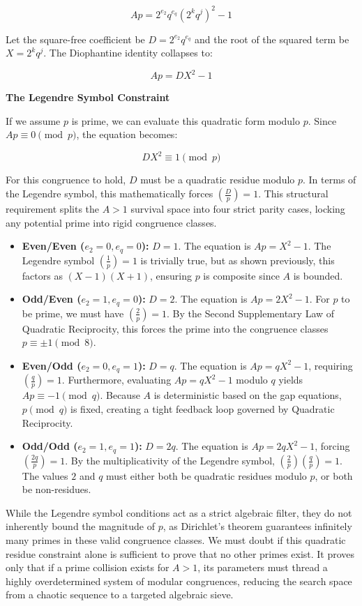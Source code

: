 \documentclass{article}
\begin{document}
$$Ap = 2^{e_2} q^{e_q} (2^k q^j)^2 - 1$$

Let the square-free coefficient be $D = 2^{e_2} q^{e_q}$ and the root of the squared term be $X = 2^k q^j$. The Diophantine identity collapses to:

$$Ap = DX^2 - 1$$

\textbf{The Legendre Symbol Constraint}

If we assume $p$ is prime, we can evaluate this quadratic form modulo $p$. Since $Ap \equiv 0 \pmod p$, the equation becomes:

$$DX^2 \equiv 1 \pmod p$$

For this congruence to hold, $D$ must be a quadratic residue modulo $p$. In terms of the Legendre symbol, this mathematically forces $\left( \frac{D}{p} \right) = 1$. This structural requirement splits the $A > 1$ survival space into four strict parity cases, locking any potential prime into rigid congruence classes.

\begin{itemize}
    \item \textbf{Even/Even ($e_2 = 0, e_q = 0$):} $D = 1$. The equation is $Ap = X^2 - 1$. The Legendre symbol $\left(\frac{1}{p}\right) = 1$ is trivially true, but as shown previously, this factors as $(X-1)(X+1)$, ensuring $p$ is composite since $A$ is bounded.
    \item \textbf{Odd/Even ($e_2 = 1, e_q = 0$):} $D = 2$. The equation is $Ap = 2X^2 - 1$. For $p$ to be prime, we must have $\left( \frac{2}{p} \right) = 1$. By the Second Supplementary Law of Quadratic Reciprocity, this forces the prime into the congruence classes $p \equiv \pm 1 \pmod 8$.
    \item \textbf{Even/Odd ($e_2 = 0, e_q = 1$):} $D = q$. The equation is $Ap = qX^2 - 1$, requiring $\left( \frac{q}{p} \right) = 1$. Furthermore, evaluating $Ap = qX^2 - 1$ modulo $q$ yields $Ap \equiv -1 \pmod q$. Because $A$ is deterministic based on the gap equations, $p \pmod q$ is fixed, creating a tight feedback loop governed by Quadratic Reciprocity.
    \item \textbf{Odd/Odd ($e_2 = 1, e_q = 1$):} $D = 2q$. The equation is $Ap = 2qX^2 - 1$, forcing $\left( \frac{2q}{p} \right) = 1$. By the multiplicativity of the Legendre symbol, $\left( \frac{2}{p} \right) \left( \frac{q}{p} \right) = 1$. The values $2$ and $q$ must either both be quadratic residues modulo $p$, or both be non-residues.
\end{itemize}

While the Legendre symbol conditions act as a strict algebraic filter, they do not inherently bound the magnitude of $p$, as Dirichlet's theorem guarantees infinitely many primes in these valid congruence classes. We must doubt if this quadratic residue constraint alone is sufficient to prove that no other primes exist. It proves only that if a prime collision exists for $A > 1$, its parameters must thread a highly overdetermined system of modular congruences, reducing the search space from a chaotic sequence to a targeted algebraic sieve.
\end{document}
